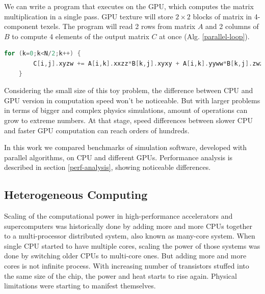 We can write a program that executes on the GPU, which computes the matrix multiplication in a single pass. GPU texture will store $2 \times 2$ blocks of matrix in 4-component texels. The program will read 2 rows from matrix $A$ and 2 columns of $B$ to compute 4 elements of the output matrix $C$ at once (Alg. \ref{parallel-loop}).

\begin{lstlisting}[language=Cpp, caption=Pseudocode with serial loop., label=parallel-loop]
	for (k=0;k<N/2;k++) {
		C[i,j].xyzw += A[i,k].xxzz*B[k,j].xyxy + A[i,k].yyww*B[k,j].zwzw;
	}
\end{lstlisting}

Considering the small size of this toy problem, the difference between CPU and GPU version in computation speed won't be noticeable. But with larger problems in terms of bigger and complex physics simulations, amount of operations can grow to extreme numbers. At that stage, speed differences between slower CPU and faster GPU computation can reach orders of hundreds.

In this work we compared benchmarks of simulation software, developed with parallel algorithms, on CPU and different GPUs. Performance analysis is described in section \ref{perf-analysis}, showing noticeable differences.

%
%
%
%
%



\subsection{Heterogeneous Computing}
Scaling of the computational power in high-performance accelerators and supercomputers was historically done by adding more and more CPUs together to a multi-processor distributed system, also known as many-core system. When single CPU started to have multiple cores, scaling the power of those systems was done by switching older CPUs to multi-core ones. But adding more and more cores is not infinite process. With increasing number of transistors stuffed into the same size of the chip, the power and heat starts to rise again. Physical limitations were starting to manifest themselves.

